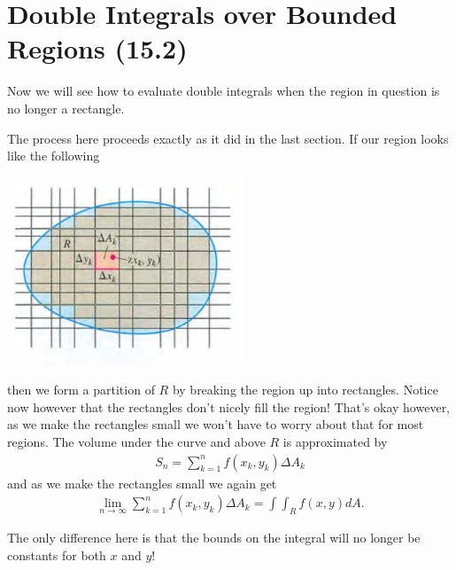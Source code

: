 \documentclass[12pt, letter]{article}
\theoremstyle{plain}
\numberwithin{theorem}{section}
\theoremstyle{definition}
\begin{document}
\newpage


\section{Double Integrals over Bounded Regions (15.2)}

Now we will see how to evaluate double integrals when the region in question is no longer a rectangle.

\bigskip

The process here proceeds exactly as it did in the last section. If our region looks like the following 

\bigskip

\begin{center}
\includegraphics[scale=0.7]{m3_f8}
\end{center}

\bigskip

then we form a partition of $R$ by breaking the region up into rectangles. Notice now however that the rectangles don't nicely fill the region! That's okay however, as we make the rectangles small we won't have to worry about that for most regions. The volume under the curve and above $R$ is approximated by
\begin{align*}
S_n = \sum_{k=1}^n f(x_k,y_k) \Delta A_k
\end{align*}
and as we make the rectangles small we again get
\begin{align*}
\lim_{n\to\infty} \sum_{k=1}^n f(x_k,y_k)\Delta A_k = \int \int_R f(x,y) dA.
\end{align*}

The only difference here is that the bounds on the integral will no longer be constants for both $x$ and $y$!

\bigskip
\end{document}

